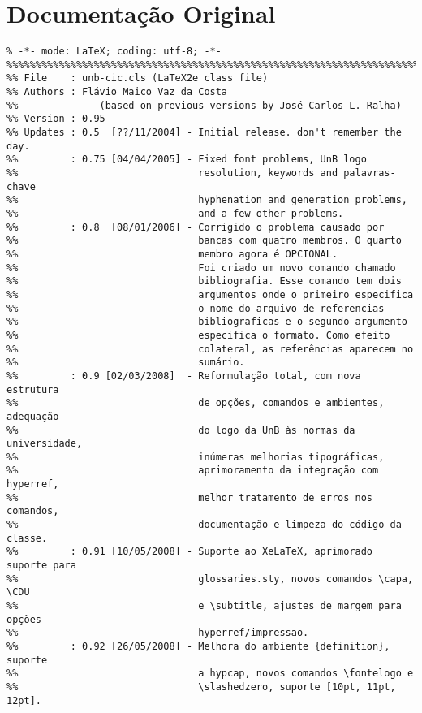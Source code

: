 \chapter{Documentação Original}%
\small\begin{verbatim}
% -*- mode: LaTeX; coding: utf-8; -*-
%%%%%%%%%%%%%%%%%%%%%%%%%%%%%%%%%%%%%%%%%%%%%%%%%%%%%%%%%%%%%%%%%%%%%%%%%%%%%%%
%% File    : unb-cic.cls (LaTeX2e class file)
%% Authors : Flávio Maico Vaz da Costa
%%              (based on previous versions by José Carlos L. Ralha)
%% Version : 0.95
%% Updates : 0.5  [??/11/2004] - Initial release. don't remember the day.
%%         : 0.75 [04/04/2005] - Fixed font problems, UnB logo
%%                               resolution, keywords and palavras-chave
%%                               hyphenation and generation problems,
%%                               and a few other problems.
%%         : 0.8  [08/01/2006] - Corrigido o problema causado por
%%                               bancas com quatro membros. O quarto
%%                               membro agora é OPCIONAL.
%%                               Foi criado um novo comando chamado
%%                               bibliografia. Esse comando tem dois
%%                               argumentos onde o primeiro especifica
%%                               o nome do arquivo de referencias
%%                               bibliograficas e o segundo argumento
%%                               especifica o formato. Como efeito
%%                               colateral, as referências aparecem no
%%                               sumário.
%%         : 0.9 [02/03/2008]  - Reformulação total, com nova estrutura
%%                               de opções, comandos e ambientes, adequação
%%                               do logo da UnB às normas da universidade,
%%                               inúmeras melhorias tipográficas,
%%                               aprimoramento da integração com hyperref,
%%                               melhor tratamento de erros nos comandos,
%%                               documentação e limpeza do código da classe.
%%         : 0.91 [10/05/2008] - Suporte ao XeLaTeX, aprimorado suporte para
%%                               glossaries.sty, novos comandos \capa, \CDU
%%                               e \subtitle, ajustes de margem para opções
%%                               hyperref/impressao.
%%         : 0.92 [26/05/2008] - Melhora do ambiente {definition}, suporte
%%                               a hypcap, novos comandos \fontelogo e
%%                               \slashedzero, suporte [10pt, 11pt, 12pt].

\end{verbatim}
